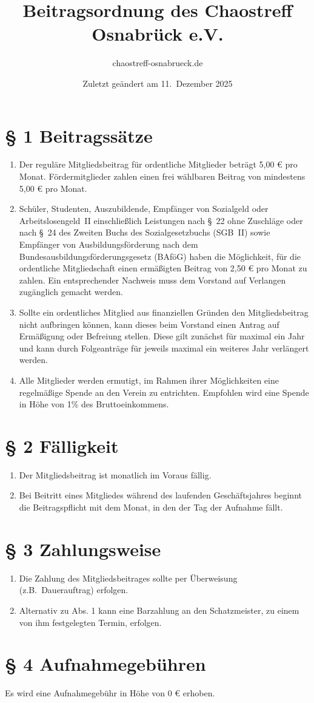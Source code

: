 \documentclass[a4paper,12pt]{scrartcl}
\title{Beitragsordnung des Chaostreff Osnabrück e.V.}
\author{chaostreff-osnabrueck.de}
\date{Zuletzt geändert am 11.\ Dezember 2025}
\begin{document}
\maketitle

\section*{\S{} 1 Beitragssätze}
\begin{enumerate}
\item[(1)]
Der reguläre Mitgliedsbeitrag für ordentliche Mitglieder beträgt 5,00 €
pro Monat. Fördermitglieder zahlen einen frei wählbaren Beitrag von
mindestens 5,00 € pro Monat.
\item[(2)]
Schüler, Studenten, Auszubildende, Empfänger von Sozialgeld oder
Arbeitslosengeld~II einschließlich Leistungen nach §~22 ohne Zuschläge
oder nach §~24 des Zweiten Buchs des Sozialgesetzbuchs (SGB~II) sowie
Empfänger von Ausbildungsförderung nach dem
Bundesausbildungsförderungsgesetz (BAföG) haben die Möglichkeit, für
die ordentliche Mitgliedschaft einen ermäßigten Beitrag von 2,50 € pro
Monat zu zahlen. Ein entsprechender Nachweis muss dem Vorstand auf
Verlangen zugänglich gemacht werden.
\item[(3)]
Sollte ein ordentliches Mitglied aus finanziellen Gründen den
Mitgliedsbeitrag nicht aufbringen können, kann dieses beim Vorstand
einen Antrag auf Ermäßigung oder Befreiung stellen. Diese gilt
zunächst für maximal ein Jahr und kann durch Folgeanträge für jeweils
maximal ein weiteres Jahr verlängert werden.
\item[(4)]
Alle Mitglieder werden ermutigt, im Rahmen ihrer Möglichkeiten eine
regelmäßige Spende an den Verein zu entrichten. Empfohlen wird eine
Spende in Höhe von 1\% des Bruttoeinkommens.
\end{enumerate}

\section*{\S{} 2 Fälligkeit}
\begin{enumerate}
\item[(1)]
Der Mitgliedsbeitrag ist monatlich im Voraus fällig.
\item[(2)]
Bei Beitritt eines Mitgliedes während des laufenden Geschäftsjahres
beginnt die Beitragspflicht mit dem Monat, in den der Tag der Aufnahme fällt.
\end{enumerate}

\section*{\S{} 3 Zahlungsweise}
\begin{enumerate}
\item[(1)]
Die Zahlung des Mitgliedsbeitrages sollte per Überweisung (z.B.\
Dauerauftrag) erfolgen.
\item[(2)]
Alternativ zu Abs. 1 kann eine Barzahlung an 
den Schatzmeister, zu einem von ihm festgelegten Termin, erfolgen.
\end{enumerate}

\section*{\S{} 4 Aufnahmegebühren}
Es wird eine Aufnahmegebühr in Höhe von 0 € erhoben.
\end{document}
